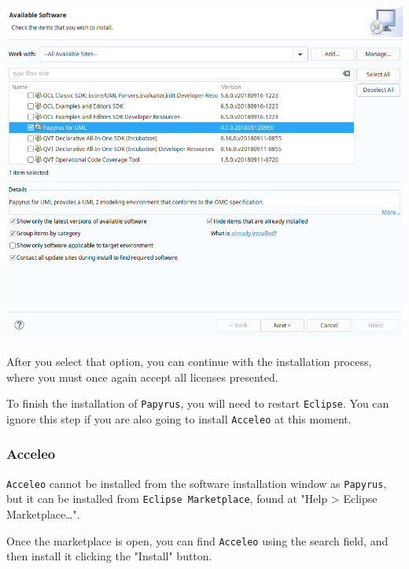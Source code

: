 \documentclass[11pt]{article}
\begin{document}
\begin{center}
\includegraphics[width=.9\linewidth]{images/papyrus.png}
\end{center}

After you select that option, you can continue with the installation process, where you must once again accept all licenses presented.

To finish the installation of \texttt{Papyrus}, you will need to restart
\texttt{Eclipse}. You can ignore this step if you are also going to install \texttt{Acceleo} at this moment.

\subsubsection{Acceleo}
\label{sec:orgfd3943c}

\texttt{Acceleo} cannot be installed from the software installation window as \texttt{Papyrus}, but it can be installed from \texttt{Eclipse Marketplace},
found at "Help > Eclipse Marketplace\ldots{}".

Once the marketplace is open, you can find \texttt{Acceleo} using the search field, and then install it clicking the "Install" button.
\end{document}
